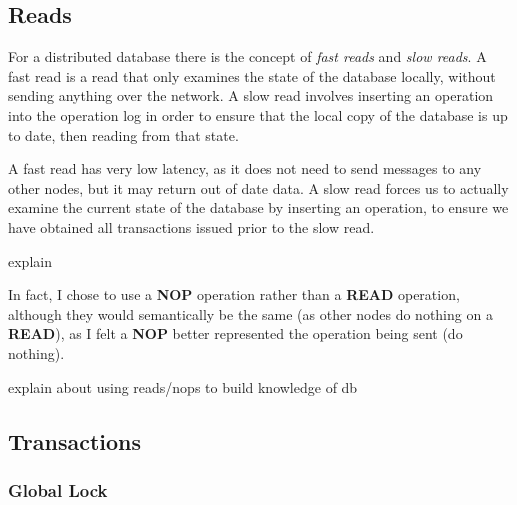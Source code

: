 \documentclass[12pt,twoside,notitlepage]{report}
\newcommand{\op}[1]  {{\bf #1}}         %
\begin{document}
\subsection{Reads}

For a distributed database there is the concept of \emph{fast reads} and \emph{slow reads}. A fast
read is a read that only examines the state of the database locally, without sending anything over
the network.  A slow read involves inserting an operation into the operation log in order to
ensure that the local copy of the database is up to date, then reading from that state.

A fast read has very low latency, as it does not need to send messages to any other nodes, but it
may return out of date data. A slow read forces us to actually examine the current state of the
database by inserting an operation, to ensure we have obtained all transactions issued
prior to the slow read.

explain

In fact, I chose to use a \op{NOP} operation rather than a \op{READ} operation, although they
would semantically be the same (as other nodes do nothing on a \op{READ}), as I felt a \op{NOP}
better represented the operation being sent (do nothing).

explain about using reads/nops to build knowledge of db


\subsection{Transactions}

\subsubsection{Global Lock}
\end{document}

